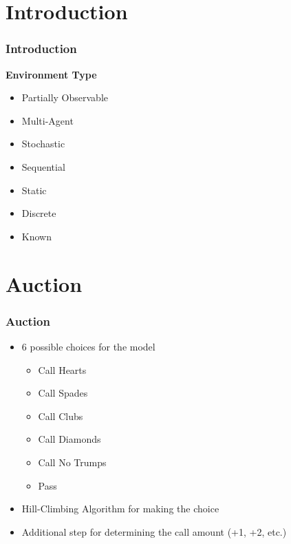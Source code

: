 \documentclass{beamer}
\begin{document}
\section{Introduction}
\begin{frame}\frametitle{Introduction}
    \begin{center}
        \textbf{Environment Type}
    \end{center}
    \begin{itemize}
        \item Partially Observable
        \item Multi-Agent
        \item Stochastic
        \item Sequential
        \item Static
        \item Discrete
        \item Known
    \end{itemize}
\end{frame}

\section{Auction} 
\begin{frame}\frametitle{Auction}
    \begin{center}
        \begin{itemize}
            \item 6 possible choices for the model
                \begin{itemize}
                    \item Call Hearts
                    \item Call Spades
                    \item Call Clubs
                    \item Call Diamonds
                    \item Call No Trumps
                    \item Pass
                \end{itemize}
            \item Hill-Climbing Algorithm for making the choice
            \item Additional step for determining the call amount (+1, +2, etc.)
        \end{itemize}
    \end{center}
\end{frame}
\end{document}
